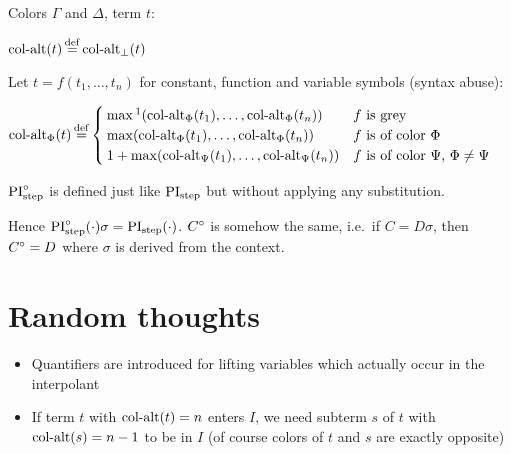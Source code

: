 \documentclass[,%
	draft=false,%
	numbers=noendperiod
	12pt,
	a4paper,
	oneside,%
	openany,
]{memoir}
\begin{document}
\begin{defi}
	Colors $\Gamma$ and $\Delta$, term $t$:

	$\ca(t) \defeq \ca_\bot(t)$

	Let $t = f(t_1, \dots, t_n)$ for constant, function and variable symbols (syntax abuse):

	$\ca_\Phi(t) \defeq 
	\begin{cases}
		\max\footnotemark(\ca_\Phi(t_1), \dots, \ca_\Phi(t_n)) & \text{$f$ is grey} \\
		\max(\ca_\Phi(t_1), \dots, \ca_\Phi(t_n)) & \text{$f$ is of color $\Phi$} \\
		1 + \max(\ca_\Psi(t_1), \dots, \ca_\Psi(t_n)) & \text{$f$ is of color $\Psi$, $\Phi \neq \Psi$} \\
	\end{cases}
	$
\end{defi}

\begin{defi}
	$\operatorname{PI}^\circ_{\mathrm{step}}$ is defined just like $\operatorname{PI}_{\mathrm{step}}$ but without applying any substitution.
\end{defi}
Hence $\operatorname{PI}^\circ_{\mathrm{step}}(\cdot) \sigma = \operatorname{PI}_{\mathrm{step}}(\cdot)$.
$C^\circ$ is somehow the same, i.e.\ if $C = D\sigma$, then $C^\circ = D$ where $\sigma$ is derived from the context.

\section{ Random thoughts }

\begin{itemize}
	\item Quantifiers are introduced for lifting variables which actually occur in the interpolant
	\item If term $t$ with $\operatorname{col-alt}(t) = n$ enters $I$, we need subterm $s$ of $t$ with $\operatorname{col-alt}(s) = n-1$ to be in $I$ (of course colors of $t$ and $s$ are exactly opposite)
\end{itemize}
\end{document}
